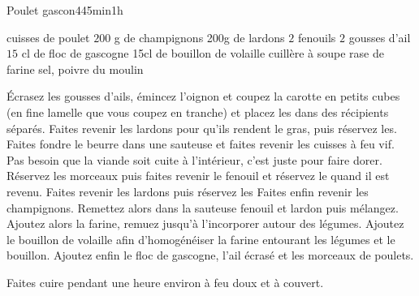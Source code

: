 \begin{recette}{Poulet gascon}{4}{45min}{1h}

\begin{ingredients}
 cuisses de poulet
\ingredient $200$ g de champignons
\ingredient 200g de lardons
\ingredient $2$ fenouils
\ingredient $2$ gousses d'ail
\ingredient $15$ cl de floc de gascogne
\ingredient 15cl de bouillon de volaille
 cuillère à soupe rase de farine
\ingredient sel, poivre du moulin
\end{ingredients}

\begin{preparation}
\etape Écrasez les gousses d'ails, émincez l'oignon et coupez la carotte en petits cubes (en fine lamelle que vous coupez en 
tranche) et placez les dans des récipients séparés.
\etape Faites revenir les lardons pour qu'ils rendent le gras, puis réservez les.
\etape Faites fondre le beurre dans une sauteuse et faites revenir les cuisses à feu vif. Pas besoin que la viande soit cuite à l'intérieur, c'est juste pour faire dorer.
\etape Réservez les morceaux puis faites revenir le fenouil et réservez le quand il est revenu.
\etape Faites revenir les lardons puis réservez les
\etape Faites enfin revenir les champignons.
\etape Remettez alors dans la sauteuse fenouil et lardon puis mélangez.
\etape Ajoutez alors la farine, remuez jusqu'à l'incorporer autour des légumes.
\etape Ajoutez le bouillon de volaille afin d'homogénéiser la farine entourant les légumes et le bouillon.
\etape Ajoutez enfin le floc de gascogne, l'ail écrasé et les morceaux de poulets.
\end{preparation}

\begin{cuisson}
Faites cuire pendant une heure environ à feu doux et à couvert.
\end{cuisson}

\end{recette}

